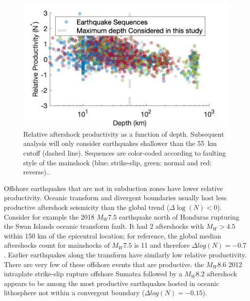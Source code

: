 \documentclass[draft, jgrga]{agujournal2018}
\begin{document}
    \begin{figure}
        \centering
        \includegraphics{prod_vs_depth.png}
        \caption{Relative aftershock productivity as a function of depth. Subsequent analysis will only consider earthquakes shallower than the 55~km cutoff (dashed line). Sequences are color-coded according to faulting style of the mainshock (blue: strike-slip, green: normal and red: reverse)..
        }
        \label{fig:prod_vs_depth}
    \end{figure}

    Offshore earthquakes that are not in subduction zones have lower relative productivity. Oceanic transform and divergent boundaries usually host less productive aftershock seismicity than the global trend ($\Delta \log(N)<0$). Consider for example the 2018 $M_W7.5$ earthquake north of Honduras rupturing the Swan Islands oceanic transform fault. It had 2 aftershocks with $M_W>4.5$ within 150 km of the epicentral location; for reference, the global median aftershocks count for mainshocks of $M_W7.5$ is 11 and therefore $\Delta log(N) = -0.7$. Earlier earthquakes along the transform have similarly low relative productivity. There are very few of these offshore events that are productive.  the $M_W8.6$ 2012 intraplate strike-slip rupture offshore Sumatra followed by a $M_W8.2$ aftershock appears to be among the most productive earthquakes hosted in oceanic lithosphere not within a convergent boundary ($\Delta log(N) = -0.15$).
\end{document}

